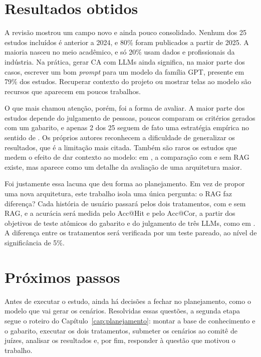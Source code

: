 \section{Resultados obtidos}

A revisão mostrou um campo novo e ainda pouco consolidado. Nenhum dos 25 estudos incluídos é anterior a 2024, e 80\% foram publicados a partir de 2025. A maioria nasceu no meio acadêmico, e só 20\% usam dados e profissionais da indústria. Na prática, gerar CA com LLMs ainda significa, na maior parte dos casos, escrever um bom \textit{prompt} para um modelo da família GPT, presente em 79\% dos estudos. Recuperar contexto do projeto ou mostrar telas ao modelo são recursos que aparecem em poucos trabalhos.

O que mais chamou atenção, porém, foi a forma de avaliar. A maior parte dos estudos depende do julgamento de pessoas, poucos comparam os critérios gerados com um gabarito, e apenas 2 dos 25 seguem de fato uma estratégia empírica no sentido de . Os próprios autores reconhecem a dificuldade de generalizar os resultados, que é a limitação mais citada. Também são raros os estudos que medem o efeito de dar contexto ao modelo: em , a comparação com e sem RAG existe, mas aparece como um detalhe da avaliação de uma arquitetura maior.

Foi justamente essa lacuna que deu forma ao planejamento. Em vez de propor uma nova arquitetura, este trabalho isola uma única pergunta: o RAG faz diferença? Cada história de usuário passará pelos dois tratamentos, com e sem RAG, e a acurácia será medida pelo Acc@Hit e pelo Acc@Cor, a partir dos objetivos de teste atômicos do gabarito e do julgamento de três LLMs, como em . A diferença entre os tratamentos será verificada por um teste pareado, ao nível de significância de 5\%.

\section{Próximos passos}

Antes de executar o estudo, ainda há decisões a fechar no planejamento, como o modelo que vai gerar os cenários. Resolvidas essas questões, a segunda etapa segue o roteiro do Capítulo~\ref{cap:planejamento}: montar a base de conhecimento e o gabarito, executar os dois tratamentos, submeter os cenários ao comitê de juízes, analisar os resultados e, por fim, responder à questão que motivou o trabalho.

